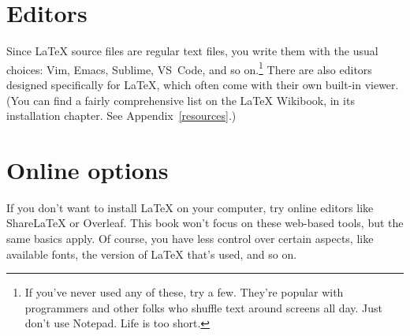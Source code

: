 \section{Editors}

Since \LaTeX{} source files are regular text files,
you write them with the usual choices: Vim, Emacs,
Sublime, VS~Code, and so on.\punckern\footnote{If you've never used
any of these, try a few.
They're popular with programmers and other folks who shuffle text around
screens all day. Just don't use Notepad. Life is too short.}
There are also editors designed specifically for \LaTeX{},
which often come with their own built-in  viewer.
(You can find a fairly comprehensive list on the \LaTeX{} Wikibook,
in its installation chapter. See Appendix~\ref{resources}.)

\section{Online options}

If you don't want to install \LaTeX{} on your computer,
try online editors like Share\LaTeX{} or Overleaf.
This book won't focus on these web-based tools,
but the same basics apply.
Of course, you have less control over certain aspects,
like available fonts, the version of \LaTeX{} that's used, and so on.
